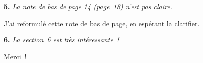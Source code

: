 \documentclass[12pt,french]{article}
\begin{document}
\bigskip
\noindent\textbf{5.} \textit{La note de bas de page 14 (page~18) n'est pas claire.}

J'ai reformulé cette note de bas de page, en espérant la clarifier.

\bigskip
\noindent\textbf{6.} \textit{La section~6 est très intéressante~!}

Merci~!

\clearpage
\renewcommand{\url}[1]{\href{#1}{Link}}
% 
% 
\end{document}
